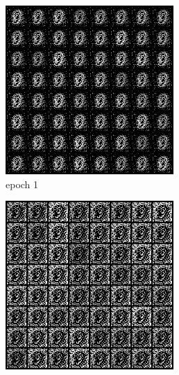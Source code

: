 \documentclass[a4paper]{article}
\theoremstyle{definition}
\newenvironment{soln}{
	\leavevmode\color{blue}\ignorespaces
}{}
\begin{document}
\begin{enumerate} [label=(\alph*)]
\begin{soln}
			\begin{figure}[H]
				\centering
				\begin{subfigure}[b]{0.3\textwidth}
					\centering
					\includegraphics[width=\textwidth]{1b_e1.png}
					\caption{epoch 1}
				\end{subfigure}
				\hfill
				\begin{subfigure}[b]{0.3\textwidth}
					\centering
					\includegraphics[width=\textwidth]{1b_e50.png}

\end{subfigure}
\end{figure}
\end{soln}
\end{enumerate}
\end{document}
